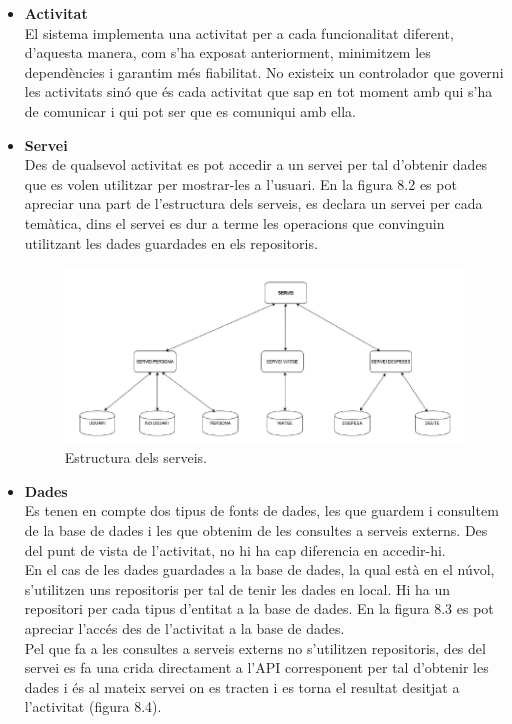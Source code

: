 \begin{itemize}

\item[]{\textbf{Activitat}}\\
El sistema implementa una activitat per a cada funcionalitat diferent, d'aquesta manera, com s'ha exposat anteriorment, minimitzem les dependències i garantim més fiabilitat. No existeix un controlador que governi les activitats sinó que és cada activitat que sap en tot moment amb qui s'ha de comunicar i qui pot ser que es comuniqui amb ella.\\

\item[]{\textbf{Servei}}\\
Des de qualsevol activitat es pot accedir a un servei per tal d'obtenir dades que es volen utilitzar per mostrar-les a l'usuari. En la figura 8.2 es pot apreciar una part de l'estructura dels serveis, es declara un servei per cada temàtica, dins el servei es dur a terme les operacions que convinguin utilitzant les dades guardades en els repositoris.

\begin{figure}[!h]
\centering
\includegraphics[scale=0.70]{Figures/EstructuraServeis.jpg}
\caption{Estructura dels serveis.}
\end{figure}

\item[]{\textbf{Dades}}\\
Es tenen en compte dos tipus de fonts de dades, les que guardem i consultem de la base de dades i les que obtenim de les consultes a serveis externs. Des del punt de vista de l'activitat, no hi ha cap diferencia en accedir-hi. \\
En el cas de les dades guardades a la base de dades, la qual està en el núvol, s'utilitzen uns repositoris per tal de tenir les dades en local. Hi ha un repositori per cada tipus d'entitat a la base de dades. En la figura 8.3 es pot apreciar l'accés des de l'activitat a la base de dades.\\
Pel que fa a les consultes a serveis externs no s'utilitzen repositoris, des del servei es fa una crida directament a l'API corresponent per tal d'obtenir les dades i és al mateix servei on es tracten i es torna el resultat desitjat a l'activitat (figura 8.4).


\end{itemize}
